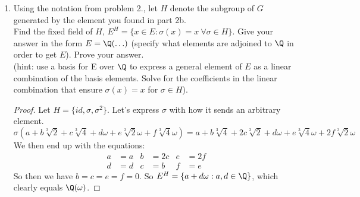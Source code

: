 \documentclass[12pt]{article}
\begin{document}
\begin{enumerate}
		\item Using the notation from problem 2., let $H$ denote the subgroup
		of $G$ generated by the element you found in part 2b.\\
		Find the fixed field of $H$, $E^H = \{x \in E : \sigma(x) = x\ \forall \sigma \in H\}$. Give your answer in the form $E = \Q(\ldots)$ (specify what elements are adjoined to $\Q$ in order to get $E$). Prove your answer.\\
		(hint: use a basis for E over $\Q$ to express a general element of $E$ as
		a linear combination of the basis elements. Solve for the coefficients in the linear combination that ensure $\sigma(x) = x$ for $\sigma \in H$).
		\begin{proof}
			Let $H = \{id, \sigma, \sigma^2\}$. Let's express $\sigma$ with how it sends an arbitrary element.
			\[
				\sigma(a + b\sqrt[3]{2} + c\sqrt[3]{4} + d\omega + e\sqrt[3]{2}\omega + f\sqrt[3]{4}\omega) = a + b\sqrt[3]{4} + 2c\sqrt[3]{2} + d\omega + e\sqrt[3]{4}\omega + 2f\sqrt[3]{2}\omega
			\]
			We then end up with the equations:
			\begin{align*}
				a &= a & b &= 2c & e &= 2f\\
				d &= d & c &= b & f &= e
			\end{align*}
			So then we have $b=c=e=f=0$. So $E^H = \{a+d\omega: a,d \in \Q\}$, which clearly equals $\Q(\omega)$.
		\end{proof}
		

\end{enumerate}
\end{document}
